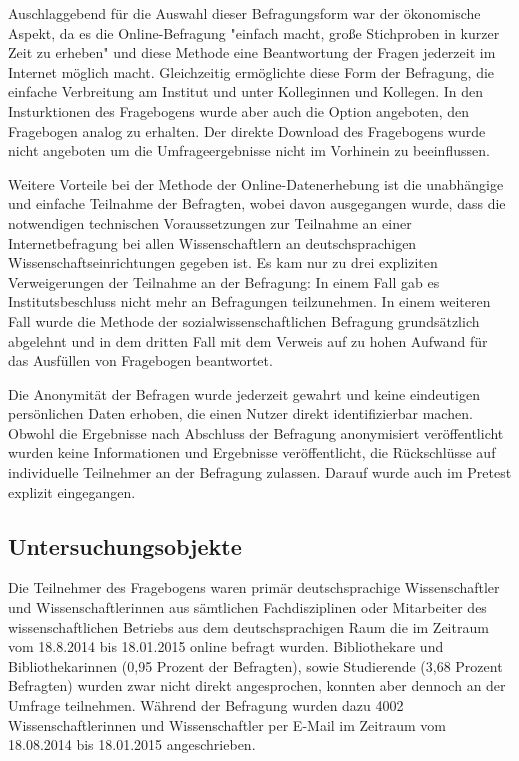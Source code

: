 Auschlaggebend für die Auswahl dieser Befragungsform war der ökonomische Aspekt, da es die Online-Befragung "einfach macht, große Stichproben in kurzer Zeit zu erheben" \cite{eichhorn_2004_online} und diese Methode eine Beantwortung der Fragen jederzeit im Internet möglich macht. Gleichzeitig ermöglichte diese Form der Befragung, die einfache Verbreitung am Institut und unter Kolleginnen und Kollegen. In den Insturktionen des Fragebogens wurde aber auch die Option angeboten, den Fragebogen analog zu erhalten. Der direkte Download des Fragebogens wurde nicht angeboten um die Umfrageergebnisse nicht im Vorhinein zu beeinflussen.

Weitere Vorteile bei der Methode der Online-Datenerhebung ist die unabhängige und einfache Teilnahme der Befragten, wobei davon ausgegangen wurde, dass die notwendigen technischen Voraussetzungen zur Teilnahme an einer Internetbefragung bei allen Wissenschaftlern an deutschsprachigen Wissenschaftseinrichtungen gegeben ist. Es kam nur zu drei expliziten Verweigerungen der Teilnahme an der Befragung: In einem Fall gab es Institutsbeschluss nicht mehr an Befragungen teilzunehmen. In einem weiteren Fall wurde die Methode der sozialwissenschaftlichen Befragung grundsätzlich abgelehnt und in dem dritten Fall mit dem Verweis auf zu hohen Aufwand für das Ausfüllen von Fragebogen beantwortet.

Die Anonymität der Befragen wurde jederzeit gewahrt und keine eindeutigen persönlichen Daten erhoben, die einen Nutzer direkt identifizierbar machen. Obwohl die Ergebnisse nach Abschluss der Befragung anonymisiert veröffentlicht wurden keine Informationen und Ergebnisse veröffentlicht, die Rückschlüsse auf individuelle Teilnehmer an der Befragung zulassen. Darauf wurde auch im Pretest explizit eingegangen.

\subsection{Untersuchungsobjekte}

Die Teilnehmer des Fragebogens waren primär deutschsprachige Wissenschaftler und Wissenschaftlerinnen aus sämtlichen Fachdisziplinen oder Mitarbeiter des wissenschaftlichen Betriebs aus dem deutschsprachigen Raum die im Zeitraum vom 18.8.2014 bis 18.01.2015 online befragt wurden. Bibliothekare und Bibliothekarinnen (0,95 Prozent der Befragten), sowie Studierende (3,68 Prozent Befragten) wurden zwar nicht direkt angesprochen, konnten aber dennoch an der Umfrage teilnehmen. Während der Befragung wurden dazu 4002 Wissenschaftlerinnen und Wissenschaftler per E-Mail im Zeitraum vom 18.08.2014 bis 18.01.2015 angeschrieben.

